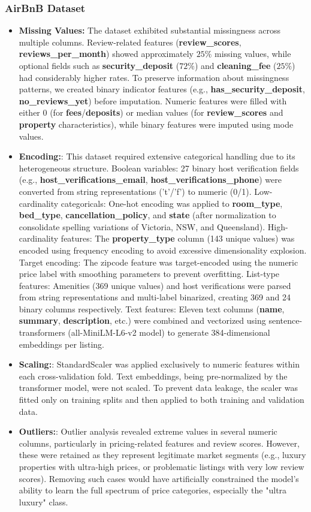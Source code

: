 \documentclass[12pt,a4paper]{article}
\begin{document}
\subsubsection{AirBnB Dataset}
\begin{itemize}
\item \textbf{Missing Values:} The dataset exhibited substantial missingness across multiple columns. Review-related features (\textbf{review\_scores}, \textbf{reviews\_per\_month}) showed approximately $25\%$ missing values, while optional fields such as \textbf{security\_deposit} ($72\%$) and \textbf{cleaning\_fee} ($25\%$) had considerably higher rates. To preserve information about missingness patterns, we created binary indicator features (e.g., \textbf{has\_security\_deposit}, \textbf{no\_reviews\_yet}) before imputation. Numeric features were filled with either 0 (for \textbf{fees}/\textbf{deposits}) or median values (for \textbf{review\_scores} and \textbf{property} characteristics), while binary features were imputed using mode values.
\item \textbf{Encoding:}: This dataset required extensive categorical handling due to its heterogeneous structure. Boolean variables: 27 binary host verification fields (e.g., \textbf{host\_verifications\_email}, \textbf{host\_verifications\_phone}) were converted from string representations ('t'/'f') to numeric (0/1). Low-cardinality categoricals: One-hot encoding was applied to \textbf{room\_type}, \textbf{bed\_type}, \textbf{cancellation\_policy}, and \textbf{state} (after normalization to consolidate spelling variations of Victoria, NSW, and Queensland). High-cardinality features: The \textbf{property\_type} column (143 unique values) was encoded using frequency encoding to avoid excessive dimensionality explosion. Target encoding: The zipcode feature was target-encoded using the numeric price label with smoothing parameters to prevent overfitting. List-type features: Amenities (369 unique values) and host verifications were parsed from string representations and multi-label binarized, creating 369 and 24 binary columns respectively. Text features: Eleven text columns (\textbf{name}, \textbf{summary}, \textbf{description}, etc.) were combined and vectorized using sentence-transformers (all-MiniLM-L6-v2 model) to generate 384-dimensional embeddings per listing.
\item \textbf{Scaling:}: StandardScaler was applied exclusively to numeric features within each cross-validation fold. Text embeddings, being pre-normalized by the transformer model, were not scaled. To prevent data leakage, the scaler was fitted only on training splits and then applied to both training and validation data.
\item \textbf{Outliers:}: Outlier analysis revealed extreme values in several numeric columns, particularly in pricing-related features and review scores. However, these were retained as they represent legitimate market segments (e.g., luxury properties with ultra-high prices, or problematic listings with very low review scores). Removing such cases would have artificially constrained the model's ability to learn the full spectrum of price categories, especially the "ultra luxury" class.
\end{itemize}
\end{document}
